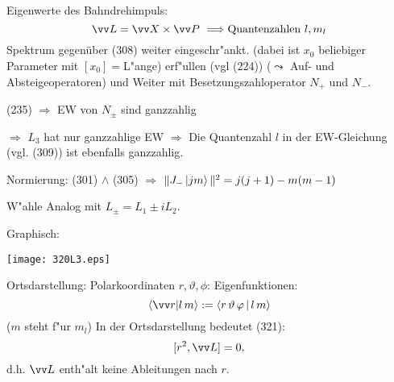 \documentclass[a4paper]{scrartcl}
\begin{document}
{Eigenwerte des Bahndrehimpuls:
$$ \vv L = \vv X \times \vv P \ \Longrightarrow \mathrm{Quantenzahlen \ } l, m_l$$
Spektrum gegenüber (308) weiter eingeschr"ankt.
(dabei ist $x_0$ beliebiger Parameter mit $[x_0] = $L"ange) erf"ullen (vgl (224))
\eqn{ [a_+, a_+^+] & = [a_-, a_-^+] = \dOne}
($\leadsto$ Auf- und Absteigeoperatoren) und
Weiter
mit Besetzungszahloperator $N_+$ und $N_-$.

(235) $\Longrightarrow$ EW von $N_\pm$ sind ganzzahlig

$\Longrightarrow$ $L_3$ hat nur ganzzahlige EW
$\Longrightarrow$ Die Quantenzahl $l$ in der EW-Gleichung (vgl. (309))
ist ebenfalls ganzzahlig.

Normierung:
(301) $\wedge$ (305) $\Longrightarrow$ $\Vert J_- \Ket{j m} \Vert^2 = j(j+1) - m(m-1)$

W"ahle
Analog
mit $L_\pm = L_1 \pm i L_2$.

Graphisch:
\begin{center}
\texttt{[image: 320L3.eps]}
\end{center}
Ortsdarstellung: Polarkoordinaten $r, \vartheta, \phi$:
Eigenfunktionen:
$$ \braket{ \vv r | l \, m } := \Braket{ r \, \vartheta \, \phi | l \, m }$$
($m$ steht f"ur $m_l$)
In der Ortsdarstellung bedeutet (321):
$$[r^2, \vv L ] = 0,$$
d.h. $\vv L$ enth"alt keine Ableitungen nach $r$.

}
\end{document}
